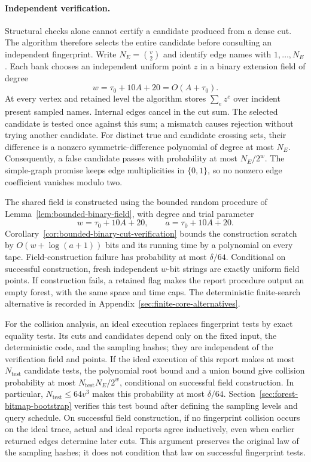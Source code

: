 \documentclass[11pt,letterpaper]{article}
\numberwithin{equation}{section}
\begin{document}
\paragraph{Independent verification.}
Structural checks alone cannot certify a candidate produced from a dense cut.
The algorithm therefore selects the entire candidate before consulting an independent fingerprint.
Write $N_E=\binom{v}{2}$ and identify edge names with $1,\ldots,N_E$.
Each bank chooses an independent uniform point $z$ in a binary extension field of degree
\begin{equation}
w=\tau_0+10A+20=O(A+\tau_0). \label{eq:forest-df5}
\end{equation}
At every vertex and retained level the algorithm stores $\sum_e z^e$ over incident present sampled names.
Internal edges cancel in the cut sum.
The selected candidate is tested once against this sum; a mismatch causes rejection without trying another candidate.
For distinct true and candidate crossing sets, their difference is a nonzero symmetric-difference polynomial of degree at most $N_E$.
Consequently, a false candidate passes with probability at most $N_E/2^w$.
The simple-graph promise keeps edge multiplicities in $\{0,1\}$, so no nonzero edge coefficient vanishes modulo two.

The shared field is constructed using the bounded random procedure of Lemma~\ref{lem:bounded-binary-field}, with degree and trial parameter
\begin{equation}
w=\tau_0+10A+20,\qquad a=\tau_0+10A+20.
                  \label{eq:forest-pu3}
\end{equation}
Corollary~\ref{cor:bounded-binary-cut-verification} bounds the construction scratch by $O(w+\log(a+1))$ bits and its running time by a polynomial on every tape.
Field-construction failure has probability at most $\delta/64$.
Conditional on successful construction, fresh independent $w$-bit strings are exactly uniform field points.
If construction fails, a retained flag makes the report procedure output an empty forest, with the same space and time caps.
The deterministic finite-search alternative is recorded in Appendix~\ref{sec:finite-core-alternatives}.

For the collision analysis, an ideal execution replaces fingerprint tests by exact equality tests.
Its cuts and candidates depend only on the fixed input, the deterministic code, and the sampling hashes; they are independent of the verification field and points.
If the ideal execution of this report makes at most $N_{\mathrm{test}}$ candidate tests, the polynomial root bound and a union bound give collision probability at most $N_{\mathrm{test}}N_E/2^w$, conditional on successful field construction.
In particular, $N_{\mathrm{test}}\le64v^3$ makes this probability at most $\delta/64$.
Section~\ref{sec:forest-bitmap-bootstrap} verifies this test bound after defining the sampling levels and query schedule.
On successful field construction, if no fingerprint collision occurs on the ideal trace, actual and ideal reports agree inductively, even when earlier returned edges determine later cuts.
This argument preserves the original law of the sampling hashes; it does not condition that law on successful fingerprint tests.
\end{document}
